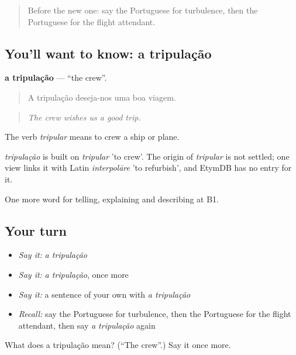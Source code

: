 \label{lesson:PT-C424-tripulacao}



\begin{quote}
Before the new one: say the Portuguese for turbulence, then the Portuguese for the flight attendant.
\end{quote}

\subsection*{You'll want to know: a tripulação}
\textbf{a tripulação} — \textquotedblleft{}the crew\textquotedblright{}.

\begin{quote}
A tripulação deseja-nos uma boa viagem.
\end{quote}

\begin{quote}
\emph{The crew wishes us a good trip.}
\end{quote}

The verb \emph{tripular} means to crew a ship or plane.

\begin{cousinweb}
\emph{tripulação} is built on \emph{tripular} 'to crew'. The origin of \emph{tripular} is not settled; one view links it with Latin \emph{interpolāre} 'to refurbish', and EtymDB has no entry for it.
\end{cousinweb}

\begin{grammarlens}[title={What you've built}]
One more word for telling, explaining and describing at B1.
\end{grammarlens}

\subsection*{Your turn}
\begin{itemize}
\raggedright
  \item \emph{Say it:} \emph{a tripulação}
  \item \emph{Say it:} \emph{a tripulação}, once more
  \item \emph{Say it:} a sentence of your own with \emph{a tripulação}
  \item \emph{Recall:} say the Portuguese for turbulence, then the Portuguese for the flight attendant, then say \emph{a tripulação} again
\end{itemize}

\begin{tcolorbox}[breakable,colback=teal!4,colframe=teal!35!black,title={Before you move on}]
What does a tripulação mean? (\textquotedblleft{}The crew\textquotedblright{}.) Say it once more.
\end{tcolorbox}
